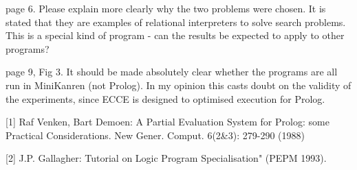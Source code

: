 page 6.  Please explain more clearly why the two problems were chosen. It is stated that they are examples of relational interpreters to solve search problems. This is a special kind of program - can the results be expected to apply to other programs?

page 9, Fig 3.  It should be made absolutely clear whether the programs are all run in MiniKanren (not Prolog). In my opinion this casts doubt on the validity of the experiments, since ECCE is designed to optimised execution for Prolog.


[1] Raf Venken, Bart Demoen:
A Partial Evaluation System for Prolog: some Practical Considerations. New Gener. Comput. 6(2\&3): 279-290 (1988)

[2] J.P. Gallagher: Tutorial on Logic Program Specialisation"  (PEPM 1993).